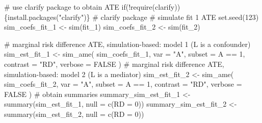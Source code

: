 \documentclass[
  singlecolumn]{article}
\newenvironment{Shaded}{}{}
\newcommand{\AttributeTok}[1]{\textcolor[rgb]{0.84,0.23,0.29}{#1}}
\newcommand{\CommentTok}[1]{\textcolor[rgb]{0.42,0.45,0.49}{#1}}
\newcommand{\ConstantTok}[1]{\textcolor[rgb]{0.00,0.36,0.77}{#1}}
\newcommand{\ControlFlowTok}[1]{\textcolor[rgb]{0.84,0.23,0.29}{#1}}
\newcommand{\DecValTok}[1]{\textcolor[rgb]{0.00,0.36,0.77}{#1}}
\newcommand{\FunctionTok}[1]{\textcolor[rgb]{0.44,0.26,0.76}{#1}}
\newcommand{\NormalTok}[1]{\textcolor[rgb]{0.14,0.16,0.18}{#1}}
\newcommand{\OtherTok}[1]{\textcolor[rgb]{0.44,0.26,0.76}{#1}}
\newcommand{\SpecialCharTok}[1]{\textcolor[rgb]{0.00,0.36,0.77}{#1}}
\newcommand{\StringTok}[1]{\textcolor[rgb]{0.01,0.18,0.38}{#1}}
\begin{document}
\begin{Shaded}
\begin{Highlighting}[]
\CommentTok{\# use \textasciigrave{}clarify\textasciigrave{} package to obtain ATE}
\ControlFlowTok{if}\NormalTok{(}\SpecialCharTok{!}\FunctionTok{require}\NormalTok{(clarify))\{}\FunctionTok{install.packages}\NormalTok{(}\StringTok{"clarify"}\NormalTok{)\} }\CommentTok{\# clarify package}
\CommentTok{\# simulate fit 1 ATE}
\FunctionTok{set.seed}\NormalTok{(}\DecValTok{123}\NormalTok{)}
\NormalTok{sim\_coefs\_fit\_1 }\OtherTok{\textless{}{-}} \FunctionTok{sim}\NormalTok{(fit\_1)}
\NormalTok{sim\_coefs\_fit\_2 }\OtherTok{\textless{}{-}} \FunctionTok{sim}\NormalTok{(fit\_2)}

\CommentTok{\# marginal risk difference ATE, simulation{-}based: model 1 (L is a confounder)}
\NormalTok{sim\_est\_fit\_1 }\OtherTok{\textless{}{-}}
  \FunctionTok{sim\_ame}\NormalTok{(}
\NormalTok{    sim\_coefs\_fit\_1,}
    \AttributeTok{var =} \StringTok{"A"}\NormalTok{,}
    \AttributeTok{subset =}\NormalTok{ A }\SpecialCharTok{==} \DecValTok{1}\NormalTok{,}
    \AttributeTok{contrast =} \StringTok{"RD"}\NormalTok{,}
    \AttributeTok{verbose =} \ConstantTok{FALSE}
\NormalTok{  )}
\CommentTok{\# marginal risk difference ATE, simulation{-}based: model 2 (L is a mediator)}
\NormalTok{sim\_est\_fit\_2 }\OtherTok{\textless{}{-}}
  \FunctionTok{sim\_ame}\NormalTok{(}
\NormalTok{    sim\_coefs\_fit\_2,}
    \AttributeTok{var =} \StringTok{"A"}\NormalTok{,}
    \AttributeTok{subset =}\NormalTok{ A }\SpecialCharTok{==} \DecValTok{1}\NormalTok{,}
    \AttributeTok{contrast =} \StringTok{"RD"}\NormalTok{,}
    \AttributeTok{verbose =} \ConstantTok{FALSE}
\NormalTok{  )}
\CommentTok{\# obtain summaries}
\NormalTok{summary\_sim\_est\_fit\_1 }\OtherTok{\textless{}{-}} \FunctionTok{summary}\NormalTok{(sim\_est\_fit\_1, }\AttributeTok{null =} \FunctionTok{c}\NormalTok{(}\StringTok{\textasciigrave{}}\AttributeTok{RD}\StringTok{\textasciigrave{}} \OtherTok{=} \DecValTok{0}\NormalTok{))}
\NormalTok{summary\_sim\_est\_fit\_2 }\OtherTok{\textless{}{-}} \FunctionTok{summary}\NormalTok{(sim\_est\_fit\_2, }\AttributeTok{null =} \FunctionTok{c}\NormalTok{(}\StringTok{\textasciigrave{}}\AttributeTok{RD}\StringTok{\textasciigrave{}} \OtherTok{=} \DecValTok{0}\NormalTok{))}


\end{Highlighting}
\end{Shaded}
\end{document}
